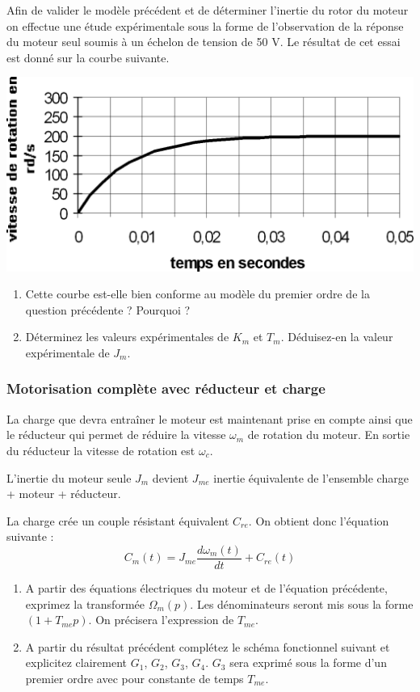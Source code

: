 Afin de valider le modèle précédent et de déterminer l’inertie du rotor du moteur on effectue une étude expérimentale sous la forme de l’observation de la réponse du moteur seul soumis à un échelon de tension de 50 V. Le résultat de cet essai est donné sur la courbe suivante.

\begin{center}
\includegraphics[width=.5\textwidth]{png/fig_02-1O}
\end{center}

\begin{enumerate}
\item Cette courbe est-elle bien conforme au modèle du premier ordre de la question précédente ? Pourquoi ?
\item Déterminez les valeurs expérimentales de $K_m$ et $T_m$. Déduisez-en la valeur expérimentale de $J_m$.
\end{enumerate}

\subsubsection{Motorisation complète avec réducteur et charge}

La charge que devra entraîner le moteur est maintenant prise en compte ainsi que le réducteur qui permet de réduire la vitesse $\omega_m$ de rotation du moteur. En sortie du réducteur la vitesse de rotation est $\omega_c$.

L’inertie du moteur seule $J_m$ devient $J_{me}$ inertie équivalente de l’ensemble  charge + moteur + réducteur.

La charge crée un couple résistant équivalent $C_{re}$. On obtient donc l’équation suivante :
$$
C_m(t)=J_{me}\dfrac{d\omega_m(t)}{dt} + C_{re}(t)
$$

\begin{enumerate}
\item A partir des équations électriques du moteur et de l’équation précédente, exprimez la transformée $\Omega_m(p)$. Les dénominateurs seront mis sous la forme $(1+T_{me} p)$. On précisera l’expression de $T_{me}$.
\item A partir du résultat précédent complétez le schéma fonctionnel suivant et explicitez clairement $G_1$, $G_2$, $G_3$, $G_4$. $G_3$ sera exprimé sous la forme d’un premier ordre avec pour constante de temps $T_{me}$.
\end{enumerate}

